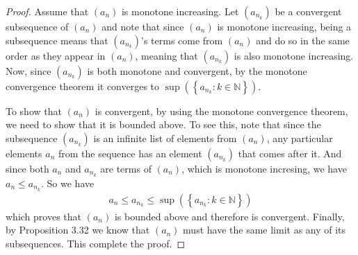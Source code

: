 \documentclass{article}
\begin{document}
\begin{proof}
	Assume that $(a_n)$ is monotone increasing. Let $(a_{n_k})$ be a convergent subsequence of $(a_n)$ and note that since
	$(a_n)$ is monotone increasing, being a subsequence means that $(a_{n_k})$'s terms come from $(a_n)$ and do so in the same
	order as they appear in $(a_n)$, meaning that $(a_{n_k})$ is also monotone increasing. Now, since $(a_{n_k})$ is both monotone and
	convergent, by the monotone convergence theorem it converges to $\sup\left(\left\{a_{n_k}: k \in \mathbb{N}\right\}\right)$.

	To show that $(a_n)$ is convergent, by using the monotone convergence theorem, we need to show that it is bounded above. To see this,
	note that since the subsequence $(a_{n_k})$ is an infinite list of elements from $(a_n)$, any particular elements $a_n$ from
	the sequence has an element $(a_{n_k})$ that comes after it. And since both $a_n$ and $a_{n_k}$ are terms of $(a_n)$, which is monotone
	incresing, we have $a_n \le a_{n_k}$. So we have
	\begin{align*}
		a_n \le a_{n_k} \le \sup\left(\left\{a_{n_k}: k \in \mathbb{N}\right\}\right)
	\end{align*}
	which proves that $(a_n)$ is bounded above and therefore is convergent. Finally, by Proposition 3.32 we know that
	$(a_n)$ must have the same limit as any of its subsequences. This complete the proof.
\end{proof}
\end{document}
